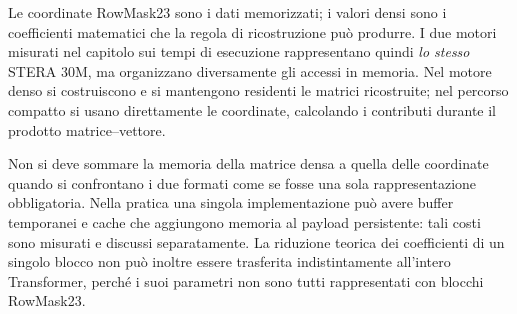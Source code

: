 Le coordinate RowMask23 sono i dati memorizzati; i valori densi sono i coefficienti matematici che la regola di ricostruzione può produrre. I due motori misurati nel capitolo sui tempi di esecuzione rappresentano quindi \emph{lo stesso} STERA 30M, ma organizzano diversamente gli accessi in memoria. Nel motore denso si costruiscono e si mantengono residenti le matrici ricostruite; nel percorso compatto si usano direttamente le coordinate, calcolando i contributi durante il prodotto matrice--vettore.

Non si deve sommare la memoria della matrice densa a quella delle coordinate quando si confrontano i due formati come se fosse una sola rappresentazione obbligatoria. Nella pratica una singola implementazione può avere buffer temporanei e cache che aggiungono memoria al payload persistente: tali costi sono misurati e discussi separatamente. La riduzione teorica dei coefficienti di un singolo blocco non può inoltre essere trasferita indistintamente all'intero Transformer, perché i suoi parametri non sono tutti rappresentati con blocchi RowMask23.
